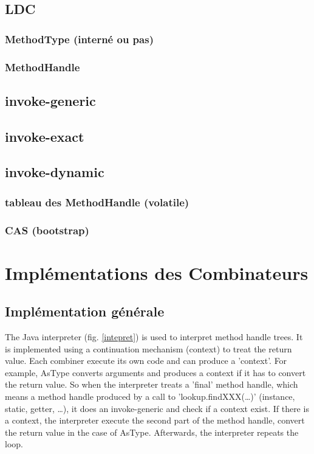 \documentclass{sigplanconf}
\begin{document}
  \subsection{LDC}

    \subsubsection{MethodType (intern\'e ou pas)}
    \subsubsection{MethodHandle}

  \subsection{invoke-generic}
  \subsection{invoke-exact}
  \subsection{invoke-dynamic}

    \subsubsection{tableau des MethodHandle (volatile)}
    \subsubsection{CAS (bootstrap)}

\section{Impl\'ementations des Combinateurs}

  \subsection{Impl\'ementation g\'en\'erale}
    The Java interpreter (fig. \ref{intepret}) is used to interpret method handle trees.
    It is implemented using a continuation mechanism (context) to treat the return value.
    Each combiner execute its own code and can produce a 'context'.
    For example, AsType converts arguments and produces a context if it has to convert the return value.
    So when the interpreter treats a 'final' method handle,
    which means a method handle produced by a call to 'lookup.findXXX(\dots)' (instance, static, getter, \dots),
    it does an invoke-generic and check if a context exist.
    If there is a context, the interpreter execute the second part of the method handle,
    convert the return value in the case of AsType.
    Afterwards, the interpreter repeats the loop.
    
\end{document}
